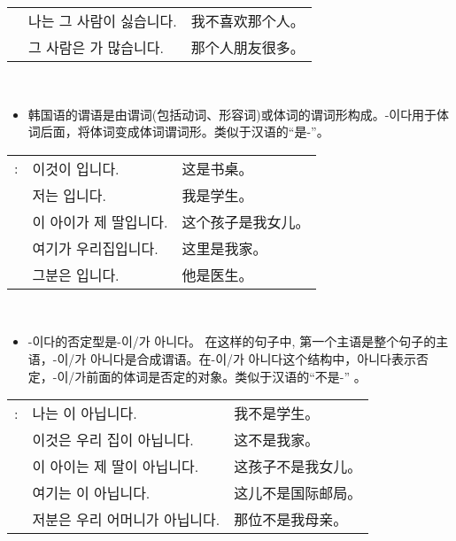 \begin{grammar}
\begin{grammarsect}[\kr -이/-가]
\begin{tabular}{lll}
            &\kr 나는 그 사람이 싫습니다.&我不喜欢那个人。\\
            &\kr 그 사람은 \ruby{親舊}{친구}가 많습니다.&那个人朋友很多。
        \end{tabular}\\
    \end{grammarsect}
    \begin{grammarsect}[\kr -이다]
        \begin{itemize}
            \item 韩国语的谓语是由谓词(包括动词、形容词)或体词的谓词形构成。{\kr -이다}用于体词后面，将体词变成体词谓词形。类似于汉语的“是-”。
        \end{itemize}
        \begin{tabular}{lll}
            \kr \ruby{例}{예}: &\kr 이것이 \ruby{冊床}{책상}입니다.&这是书桌。\\
            &\kr 저는 \ruby{學生}{학생}입니다.&我是学生。\\
            &\kr 이 아이가 제 딸입니다.&这个孩子是我女儿。\\
            &\kr 여기가 우리집입니다.&这里是我家。\\
            &\kr 그분은 \ruby{醫師}{의사}입니다.&他是医生。
        \end{tabular}\\
    \end{grammarsect}
    \begin{grammarsect}
        \begin{itemize}
            \item {\kr -이다}的否定型是{\kr -이/가 아니다}。 在这样的句子中, 第一个主语是整个句子的主语，{\kr -이/가 아니다}是合成谓语。在{\kr -이/가 아니다}这个结构中，{\kr 아니다}表示否定，{\kr -이/가}前面的体词是否定的对象。类似于汉语的“不是-” 。
        \end{itemize}
        \begin{tabular}{lll}
            \kr \ruby{例}{예}:&\kr 나는 \ruby{學生}{학생}이 아닙니다.&我不是学生。\\
            &\kr 이것은 우리 집이 아닙니다.&这不是我家。\\
            &\kr 이 아이는 제 딸이 아닙니다.&这孩子不是我女儿。\\
            &\kr 여기는 \ruby{國際郵遞局}{국제우체국}이 아닙니다.&这儿不是国际邮局。\\
            &\kr 저분은 우리 어머니가 아닙니다.&那位不是我母亲。
        \end{tabular}\\
    \end{grammarsect}
\end{grammar}
